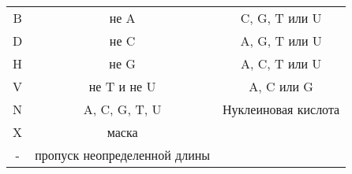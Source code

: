 \documentclass{article}
\begin{document}
\begin{table}[h]
\begin{center}
\begin{tabular}{|c|c|c|}
                                    B & не A          & C, G, T или U \\
                                    D & не C          & A, G, T или U \\
                                    H & не G          & A, C, T или U \\
                                    V & не T и не U   & A, C или G \\
                                    N & A, C, G, T, U & Нуклеиновая кислота \\
                                    X & маска         &  \\
                                    - & пропуск неопределенной длины &  \\
                                    \hline
                                \end{tabular}
                            \end{center}
                        \end{table}
\end{document}
